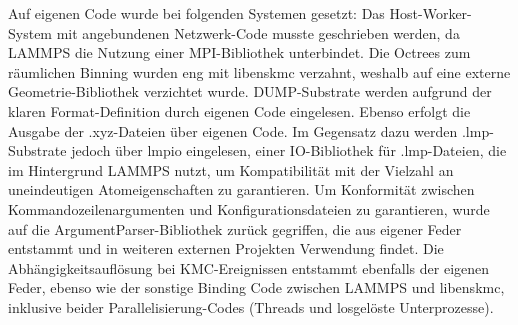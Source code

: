 Auf eigenen Code wurde bei folgenden Systemen gesetzt:
Das Host-Worker-System mit angebundenen Netzwerk-Code musste geschrieben werden, da LAMMPS die Nutzung einer MPI-Bibliothek unterbindet.
Die Octrees zum räumlichen Binning wurden eng mit libenskmc verzahnt, weshalb auf eine externe Geometrie-Bibliothek verzichtet wurde.
DUMP-Substrate werden aufgrund der klaren Format-Definition durch eigenen Code eingelesen.
Ebenso erfolgt die Ausgabe der .xyz-Dateien über eigenen Code.
Im Gegensatz dazu werden .lmp-Substrate jedoch über lmpio eingelesen, einer IO-Bibliothek für .lmp-Dateien, die im Hintergrund LAMMPS nutzt, um Kompatibilität mit der Vielzahl an uneindeutigen Atomeigenschaften zu garantieren.
Um Konformität zwischen Kommandozeilenargumenten und Konfigurationsdateien zu garantieren, wurde auf die ArgumentParser-Bibliothek zurück gegriffen, die aus eigener Feder entstammt und in weiteren externen Projekten Verwendung findet.
Die Abhängigkeitsauflösung bei KMC-Ereignissen entstammt ebenfalls der eigenen Feder, ebenso wie der sonstige Binding Code zwischen LAMMPS und libenskmc, inklusive beider Parallelisierung-Codes (Threads und losgelöste Unterprozesse).

